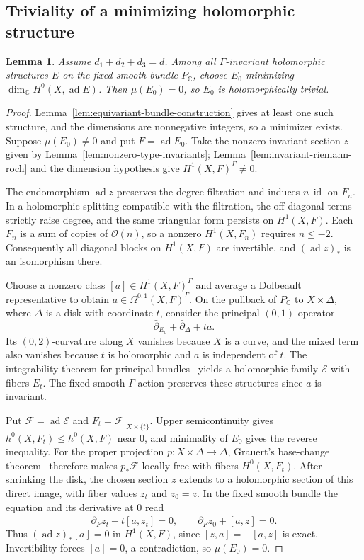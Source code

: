 \documentclass[11pt,a4paper,reqno]{amsart}
\theoremstyle{plain}
\newtheorem{lemma}[theorem]{Lemma}
\theoremstyle{definition}
\theoremstyle{remark}
\numberwithin{equation}{section}
\DeclareMathOperator{\ad}{ad}
\newcommand{\CC}{\mathbb C}
\newcommand{\cO}{\mathcal O}
\DeclareMathOperator{\id}{id}
\begin{document}
\subsection{Triviality of a minimizing holomorphic structure}

\begin{lemma}\label{lem:minimal-type-zero}
Assume $d_1+d_2+d_3=d$. Among all $\Gamma$-invariant holomorphic structures $E$ on the fixed smooth bundle $P_{\CC}$, choose $E_0$ minimizing $\dim_{\CC}H^0(X,\ad E)$. Then $\mu(E_0)=0$, so $E_0$ is holomorphically trivial.
\end{lemma}

\begin{proof}
Lemma~\ref{lem:equivariant-bundle-construction} gives at least one such structure, and the dimensions are nonnegative integers, so a minimizer exists. Suppose $\mu(E_0)\ne0$ and put $F=\ad E_0$. Take the nonzero invariant section $z$ given by Lemma~\ref{lem:nonzero-type-invariants}; Lemma~\ref{lem:invariant-riemann-roch} and the dimension hypothesis give $H^1(X,F)^\Gamma\ne0$.

The endomorphism $\ad z$ preserves the degree filtration and induces $n\,\id$ on $F_n$. In a holomorphic splitting compatible with the filtration, the off-diagonal terms strictly raise degree, and the same triangular form persists on $H^1(X,F)$. Each $F_n$ is a sum of copies of $\cO(n)$, so a nonzero $H^1(X,F_n)$ requires $n\le-2$. Consequently all diagonal blocks on $H^1(X,F)$ are invertible, and $(\ad z)_*$ is an isomorphism there.

Choose a nonzero class $[a]\in H^1(X,F)^\Gamma$ and average a Dolbeault representative to obtain $a\in\Omega^{0,1}(X,F)^\Gamma$. On the pullback of $P_{\CC}$ to $X\times\Delta$, where $\Delta$ is a disk with coordinate $t$, consider the principal $(0,1)$-operator
\[
\bar\partial_{E_0}+\bar\partial_\Delta+t a.
\]
Its $(0,2)$-curvature along $X$ vanishes because $X$ is a curve, and the mixed term also vanishes because $t$ is holomorphic and $a$ is independent of $t$. The integrability theorem for principal bundles~\cite[Theorem~A.22]{TelemanHolomorphicBundles} yields a holomorphic family $\mathcal E$ with fibers $E_t$. The fixed smooth $\Gamma$-action preserves these structures since $a$ is invariant.

Put $\mathcal F=\ad\mathcal E$ and $F_t=\mathcal F|_{X\times\{t\}}$. Upper semicontinuity gives $h^0(X,F_t)\le h^0(X,F)$ near $0$, and minimality of $E_0$ gives the reverse inequality. For the proper projection $p\colon X\times\Delta\to\Delta$, Grauert's base-change theorem~\cite[Ch.~I, \S1]{OSS} therefore makes $p_*\mathcal F$ locally free with fibers $H^0(X,F_t)$. After shrinking the disk, the chosen section $z$ extends to a holomorphic section of this direct image, with fiber values $z_t$ and $z_0=z$. In the fixed smooth bundle the equation and its derivative at $0$ read
\[
\bar\partial_F z_t+t[a,z_t]=0,\qquad
\bar\partial_F\dot z_0+[a,z]=0.
\]
Thus $(\ad z)_*[a]=0$ in $H^1(X,F)$, since $[z,a]=-[a,z]$ is exact. Invertibility forces $[a]=0$, a contradiction, so $\mu(E_0)=0$.
\end{proof}
\end{document}
